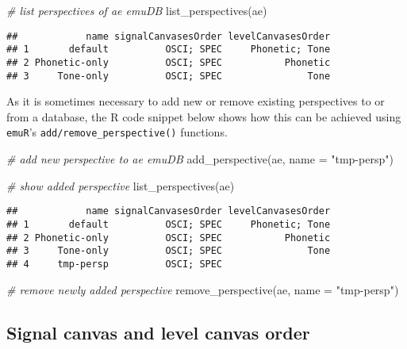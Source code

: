 \documentclass[
]{book}
\newenvironment{Shaded}{\begin{snugshade}}{\end{snugshade}}
\newcommand{\AttributeTok}[1]{\textcolor[rgb]{0.77,0.63,0.00}{#1}}
\newcommand{\CommentTok}[1]{\textcolor[rgb]{0.56,0.35,0.01}{\textit{#1}}}
\newcommand{\FunctionTok}[1]{\textcolor[rgb]{0.00,0.00,0.00}{#1}}
\newcommand{\NormalTok}[1]{#1}
\newcommand{\StringTok}[1]{\textcolor[rgb]{0.31,0.60,0.02}{#1}}
\begin{document}
\begin{Shaded}
\begin{Highlighting}[]
\CommentTok{\# list perspectives of ae emuDB}
\FunctionTok{list\_perspectives}\NormalTok{(ae)}
\end{Highlighting}
\end{Shaded}

\begin{verbatim}
##            name signalCanvasesOrder levelCanvasesOrder
## 1       default          OSCI; SPEC     Phonetic; Tone
## 2 Phonetic-only          OSCI; SPEC           Phonetic
## 3     Tone-only          OSCI; SPEC               Tone
\end{verbatim}

As it is sometimes necessary to add new or remove existing perspectives to or from a database, the R code snippet below shows how this can be achieved using \texttt{emuR}'s \texttt{add/remove\_perspective()} functions.

\begin{Shaded}
\begin{Highlighting}[]
\CommentTok{\# add new perspective to ae emuDB}
\FunctionTok{add\_perspective}\NormalTok{(ae,}
                \AttributeTok{name =} \StringTok{"tmp{-}persp"}\NormalTok{)}

\CommentTok{\# show added perspective}
\FunctionTok{list\_perspectives}\NormalTok{(ae)}
\end{Highlighting}
\end{Shaded}

\begin{verbatim}
##            name signalCanvasesOrder levelCanvasesOrder
## 1       default          OSCI; SPEC     Phonetic; Tone
## 2 Phonetic-only          OSCI; SPEC           Phonetic
## 3     Tone-only          OSCI; SPEC               Tone
## 4     tmp-persp          OSCI; SPEC
\end{verbatim}

\begin{Shaded}
\begin{Highlighting}[]
\CommentTok{\# remove newly added perspective}
\FunctionTok{remove\_perspective}\NormalTok{(ae,}
                   \AttributeTok{name =} \StringTok{"tmp{-}persp"}\NormalTok{)}
\end{Highlighting}
\end{Shaded}

\hypertarget{signal-canvas-and-level-canvas-order}{%
\subsection{Signal canvas and level canvas order}\label{signal-canvas-and-level-canvas-order}}
\end{document}
